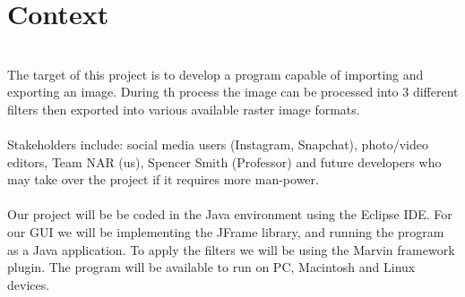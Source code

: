 \documentclass{article}
\begin{document}
\section{Context}
\\
The target of this project is to develop a program capable of importing and exporting an image. During th process the image can be processed into 3 different filters then exported into various available raster image formats. 
\\ \\
\indent Stakeholders include: social media users (Instagram, Snapchat), photo/video editors, Team NAR (us), Spencer Smith (Professor) and future developers who may take over the project if it requires more man-power.
\\ \\
\indent Our project will be be coded in the Java environment using the Eclipse IDE. For our GUI we will be implementing the JFrame library, and running the program as a Java application. To apply the filters we will be using the Marvin framework plugin. The program will be available to run on PC, Macintosh and Linux devices.
\end{document}
